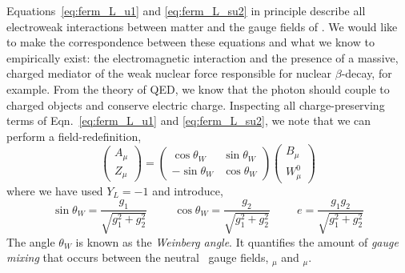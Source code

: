 
Equations~\ref{eq:ferm_L_u1} and \ref{eq:ferm_L_su2} in principle describe all electroweak interactions
between matter and the gauge fields of \SUewk. We would like to make the correspondence
between these equations and what we know to empirically exist: the electromagnetic interaction
and the presence of a massive, charged mediator of the weak nuclear force responsible
for nuclear $\beta$-decay, for example. From the theory of QED, we know that the photon should
couple to charged objects and conserve electric charge. Inspecting all charge-preserving
terms of Eqn.~\ref{eq:ferm_L_u1} and \ref{eq:ferm_L_su2}, we note that we can perform
a field-redefinition,
\begin{equation}
	\left( \begin{matrix} A_{\mu} \\ Z_{\mu} \end{matrix} \right) = \left( \begin{matrix} \cos \theta_W & \sin \theta_W \\ -\sin \theta_W & \cos \theta_W \end{matrix} \right) \left( \begin{matrix} B_{\mu} \\ W_{\mu}^0 \end{matrix} \right)
\end{equation}
where we have used $Y_L = -1$ and introduce,
\begin{equation}
\sin \theta_W = \frac{g_1}{\sqrt{g_1^2 + g_2^2}} \hspace{1cm} \cos \theta_W = \frac{g_2}{\sqrt{g_1^2 + g_2^2}} \hspace{1cm} e = \frac{g_1 g_2}{\sqrt{g_1^2 + g_2^2}}
\label{eq:weinberg_angles}
\end{equation}
The angle $\theta_W$  is known as the \textit{Weinberg angle}. It quantifies the amount of
\textit{gauge mixing} that occurs between the neutral
\SUewk~gauge fields, \fieldB$_{\mu}$ and \fieldWzero$_{\mu}$.

